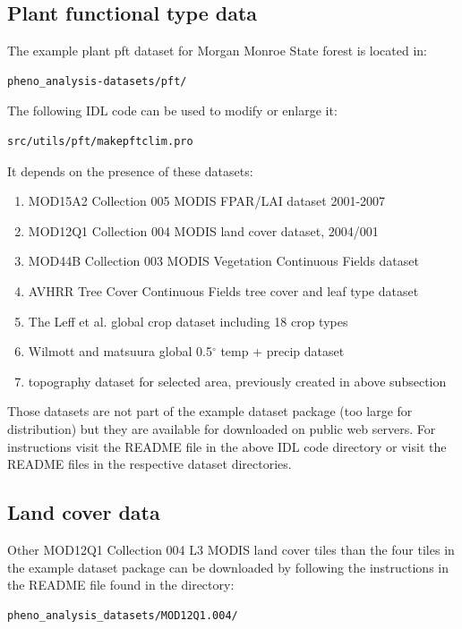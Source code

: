 \documentclass[a4paper,12pt]{article}
\newcommand{\degree}{$^{\circ}$ }
\begin{document}
\subsection{Plant functional type data}
The example plant pft dataset for Morgan Monroe State forest is located in:
\begin{verbatim}
pheno_analysis-datasets/pft/
\end{verbatim}
The following IDL code can be used to modify or enlarge it:
\begin{verbatim}
src/utils/pft/makepftclim.pro
\end{verbatim}
It depends on the presence of these datasets:
\begin{enumerate}
\item MOD15A2 Collection 005 MODIS FPAR/LAI dataset 2001-2007 \citep{Myneni2002, Justice2002}
\item MOD12Q1 Collection 004 MODIS land cover dataset, 2004/001 \citep{Friedl2002}
\item MOD44B Collection 003 MODIS Vegetation Continuous Fields dataset \citep{Hansen2005}
\item AVHRR Tree Cover Continuous Fields tree cover and leaf type dataset \citep{Defries2000a}
\item The Leff et al. global crop dataset including 18 crop types \cite{Leff2004}
\item Wilmott and matsuura global 0.5\degree temp + precip dataset \citep{Wilmott2007}
\item topography dataset for selected area, previously created in above subsection
\end{enumerate}
Those datasets are not part of the example dataset package (too large for distribution)  but they are available for downloaded on public web servers. For instructions visit the README file in the above IDL code directory or visit the README files in the respective dataset directories.

\subsection{Land cover data}
Other MOD12Q1 Collection 004 L3 MODIS land cover \citep{Friedl2002} tiles than the four tiles in the example dataset package can be downloaded by following the instructions in the README file found in the directory:
\begin{verbatim}
pheno_analysis_datasets/MOD12Q1.004/
\end{verbatim}
\end{document}
